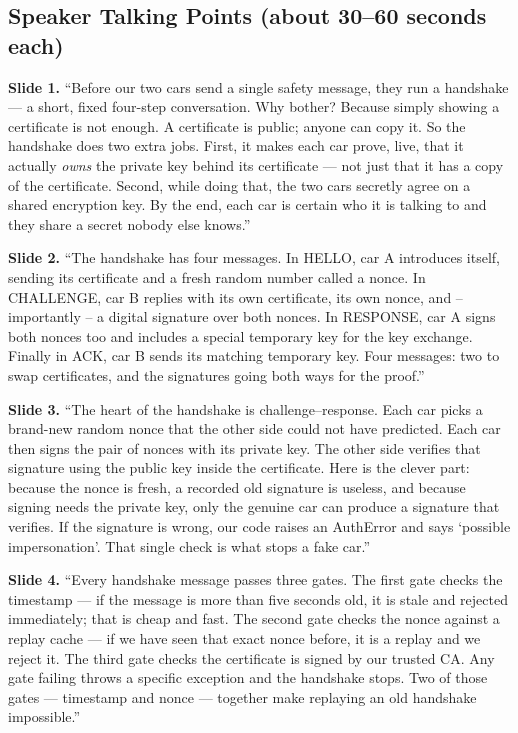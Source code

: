 \documentclass[11pt,a4paper]{article}
\begin{document}
\subsection{Speaker Talking Points (about 30--60 seconds each)}

\textbf{Slide 1.} ``Before our two cars send a single safety message, they run a
handshake --- a short, fixed four-step conversation. Why bother? Because simply
showing a certificate is not enough. A certificate is public; anyone can copy it.
So the handshake does two extra jobs. First, it makes each car prove, live, that
it actually \emph{owns} the private key behind its certificate --- not just that
it has a copy of the certificate. Second, while doing that, the two cars secretly
agree on a shared encryption key. By the end, each car is certain who it is
talking to and they share a secret nobody else knows.''

\textbf{Slide 2.} ``The handshake has four messages. In HELLO, car A introduces
itself, sending its certificate and a fresh random number called a nonce. In
CHALLENGE, car B replies with its own certificate, its own nonce, and --
importantly -- a digital signature over both nonces. In RESPONSE, car A signs
both nonces too and includes a special temporary key for the key exchange.
Finally in ACK, car B sends its matching temporary key. Four messages: two to
swap certificates, and the signatures going both ways for the proof.''

\textbf{Slide 3.} ``The heart of the handshake is challenge--response. Each car
picks a brand-new random nonce that the other side could not have predicted. Each
car then signs the pair of nonces with its private key. The other side verifies
that signature using the public key inside the certificate. Here is the clever
part: because the nonce is fresh, a recorded old signature is useless, and
because signing needs the private key, only the genuine car can produce a
signature that verifies. If the signature is wrong, our code raises an AuthError
and says `possible impersonation'. That single check is what stops a fake car.''

\textbf{Slide 4.} ``Every handshake message passes three gates. The first gate
checks the timestamp --- if the message is more than five seconds old, it is
stale and rejected immediately; that is cheap and fast. The second gate checks
the nonce against a replay cache --- if we have seen that exact nonce before, it
is a replay and we reject it. The third gate checks the certificate is signed by
our trusted CA. Any gate failing throws a specific exception and the handshake
stops. Two of those gates --- timestamp and nonce --- together make replaying an
old handshake impossible.''
\end{document}
